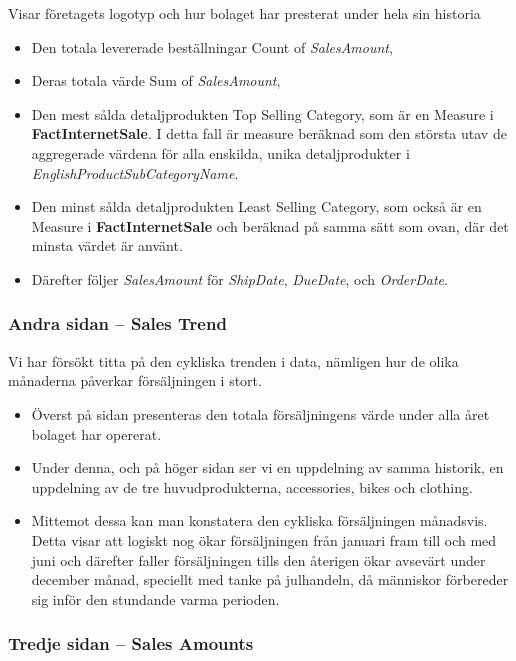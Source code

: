 \documentclass[10pt]{article}
\begin{document}
Visar företagets logotyp och hur bolaget har presterat under hela sin historia

\begin{itemize}
	\item Den totala levererade beställningar Count of \emph{SalesAmount},
	\item Deras totala värde Sum of \emph{SalesAmount},
	\item Den mest sålda detaljprodukten Top Selling Category, som är en Measure i \textbf{FactInternetSale}. I detta fall är measure beräknad som den största utav de aggregerade värdena för alla enskilda, unika detaljprodukter i \emph{EnglishProductSubCategoryName}.
	\item Den minst sålda detaljprodukten Least Selling Category, som också är en Measure i \textbf{FactInternetSale} och beräknad på samma sätt som ovan, där det minsta värdet är använt.
	\item Därefter följer \emph{SalesAmount} för \emph{ShipDate}, \emph{DueDate}, och \emph{OrderDate}.
\end{itemize}

\subsubsection{Andra sidan -- Sales Trend}

Vi har försökt titta på den cykliska trenden i data, nämligen hur de olika månaderna påverkar försäljningen i stort.

\begin{itemize}
	\item Överst på sidan presenteras den totala försäljningens värde under alla året bolaget har opererat.
	\item Under denna, och på höger sidan ser vi en uppdelning av samma historik, en uppdelning av de tre huvudprodukterna, accessories, bikes och clothing.
	\item Mittemot dessa kan man konstatera den cykliska försäljningen månadsvis. Detta visar att logiskt nog ökar försäljningen från januari fram till och med juni och därefter faller försäljningen tills den återigen ökar avsevärt under december månad, speciellt med tanke på julhandeln, då människor förbereder sig inför den stundande varma perioden.
\end{itemize}

\subsubsection{Tredje sidan -- Sales Amounts}
\end{document}
